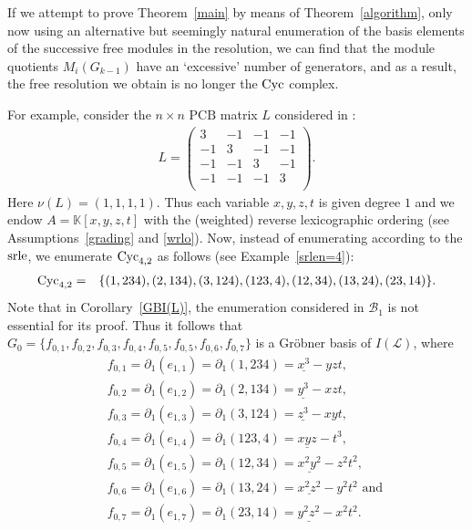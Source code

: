 \documentclass[ALCO]{cedram}
\newcommand{\mbk}{\mbox{$\mathbb{K}$}}
\newcommand{\mcb}{\mbox{$\mathcal{B}$}}
\newcommand{\mcl}{\mbox{$\mathcal{L}$}}
\newcommand{\pcb}{\mbox{$\mathrm{PCB}$}}
\newcommand{\dif}{\mbox{$\partial$}}
\newcommand{\cyc}{\mbox{${\rm Cyc}$}}
\newcommand{\srle}{\mbox{${\rm srle}$}}
\begin{document}
\begin{remark}\label{nonsrle}
If we attempt to prove Theorem~\ref{main} by means of
Theorem~\ref{algorithm}, only now using an alternative but seemingly
natural enumeration of the basis elements of the successive free
modules in the resolution, we can find that the module quotients
$M_{i}(G_{k-1})$ have an `excessive' number of generators, and as a
result, the free resolution we obtain is no longer the $\cyc$ complex.

For example, consider the $n\times n$ $\pcb$ matrix $L$ considered in
\cite[Example~1, 3]{ms}:
\begin{eqnarray*}
L=\left(\begin{array}{rrrr}
3&-1&-1&-1\\
-1&3&-1&-1\\
-1&-1&3&-1\\
-1&-1&-1&3\\
\end{array}\right).
\end{eqnarray*}
Here $\nu(L)=(1,1,1,1)$. Thus each variable $x,y,z,t$ is given degree
$1$ and we endow $A=\mbk[x,y,z,t]$ with the (weighted) reverse
lexicographic ordering (see Assumptions~\ref{grading} and
\ref{wrlo}). Now, instead of enumerating according to the $\srle$, we
enumerate $\cyc_{4,2}$ as follows (see Example~\ref{srlen=4}):
\begin{eqnarray*}
\cyc_{4,2}&=&\{(1,234),(2,134),(3,124),(123,4),(12,34),(13,24),(23,14)\}.
\end{eqnarray*}
Note that in Corollary~\ref{GBI(L)}, the enumeration considered in
$\mcb_1$ is not essential for its proof. Thus it follows that
$G_0=\{f_{0,1},f_{0,2},f_{0,3},f_{0,4},f_{0,5},f_{0,5},f_{0,6},f_{0,7}\}$
is a Gr\"obner basis of $I(\mcl)$, where
\begin{eqnarray*}
&&f_{0,1}=\dif_1(e_{1,1})=\dif_1(1,234)=\underline{x^3}-yzt,\\
&&f_{0,2}=\dif_1(e_{1,2})=\dif_1(2,134)=\underline{y^3}-xzt,\\
&&f_{0,3}=\dif_1(e_{1,3})=\dif_1(3,124)=\underline{z^3}-xyt,\\ 
&&f_{0,4}=\dif_1(e_{1,4})=\dif_1(123,4)=\underline{xyz}-t^3,\\
&&f_{0,5}=\dif_1(e_{1,5})=\dif_1(12,34)=\underline{x^2y^2}-z^2t^2,\\ 
&&f_{0,6}=\dif_1(e_{1,6})=\dif_1(13,24)=\underline{x^2z^2}-y^2t^2\mbox{ and }\\
&&f_{0,7}=\dif_1(e_{1,7})=\dif_1(23,14)=\underline{y^2z^2}-x^2t^2.
\end{eqnarray*}

\end{remark}
\end{document}
